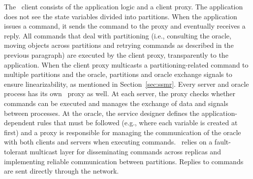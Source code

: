 The \dssmr\ client consists of the application logic and a client proxy.
The application does not see the state variables divided into partitions.
When the application issues a command, it sends the command to the proxy and eventually receives a reply.
All commands that deal with partitioning (i.e., consulting the oracle, moving objects across partitions and retrying commands as described in the previous paragraph) are executed by the client proxy, transparently to the application.
When the client proxy multicasts a partitioning-related command to multiple partitions and the oracle, partitions and oracle exchange signals to ensure linearizability, as mentioned in Section~\ref{sec:ssmr}.
Every server and oracle process has its own \dssmr\ proxy as well.
At each server, the proxy checks whether commands can be executed and manages the exchange of data and signals between processes.
At the oracle, the service designer defines the application-dependent rules that must be followed (e.g., where each variable is created at first) and a proxy is responsible for managing the communication of the oracle with both clients and servers when executing commands.
\dssmr\ relies on a fault-tolerant multicast layer for disseminating commands across replicas and implementing reliable communication between partitions.
Replies to commands are sent directly through the network.


